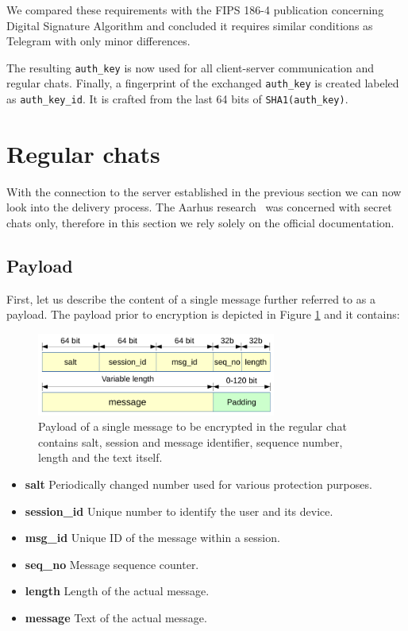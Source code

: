 \documentclass[thesis=M,english]{FITthesis}[2012/10/20]
\begin{document}
We compared these requirements with the FIPS 186-4 publication concerning Digital Signature Algorithm and concluded it requires similar conditions as Telegram with only minor differences.

The resulting \texttt{auth\_key} is now used for all client-server communication and regular chats. Finally, a fingerprint of the exchanged \texttt{auth\_key} is created labeled as \texttt{auth\_key\_id}. It is crafted from the last 64 bits of \texttt{SHA1(auth\_key)}.



\section{Regular chats}\label{crypto-regular}

With the connection to the server established in the previous section we can now look into the delivery process. The Aarhus research~\cite{telegram-aarhus} was concerned with secret chats only, therefore in this section we rely solely on the official documentation.


\subsection{Payload}\label{crypto-regular-payload}

First, let us describe the content of a single message further referred to as a payload. The payload prior to encryption is depicted in Figure \ref{img:regular-payload} and it contains:

\begin{figure}[htb]
	\centering
	\includegraphics[width=0.7\textwidth]{regular-payload.pdf}
	\caption[Message payload in regular chats]{Payload of a single message to be encrypted in the regular chat contains salt, session and message identifier, sequence number, length and the text itself.}
	\label{img:regular-payload}
\end{figure}

\begin{itemize}
	\item \textbf{salt} Periodically changed number used for various protection purposes.
	\item \textbf{session\_id} Unique number to identify the user and its device.
	\item \textbf{msg\_id} Unique ID of the message within a session.
	\item \textbf{seq\_no} Message sequence counter.
	\item \textbf{length} Length of the actual message.
	\item \textbf{message} Text of the actual message.
\end{itemize}
\end{document}
